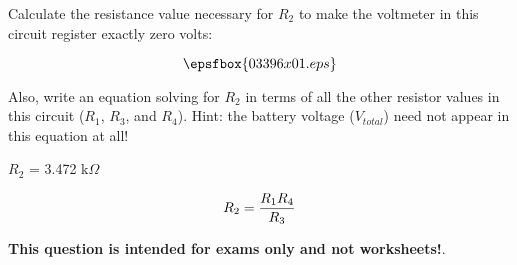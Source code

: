 

Calculate the resistance value necessary for $R_2$ to make the voltmeter in this circuit register exactly zero volts:

$$\epsfbox{03396x01.eps}$$

Also, write an equation solving for $R_2$ in terms of all the other resistor values in this circuit ($R_1$, $R_3$, and $R_4$).  Hint: the battery voltage ($V_{total}$) need not appear in this equation at all!







$R_2$ = 3.472 k$\Omega$

$$R_2 = {{R_1 R_4} \over R_3}$$







{\bf This question is intended for exams only and not worksheets!}.




